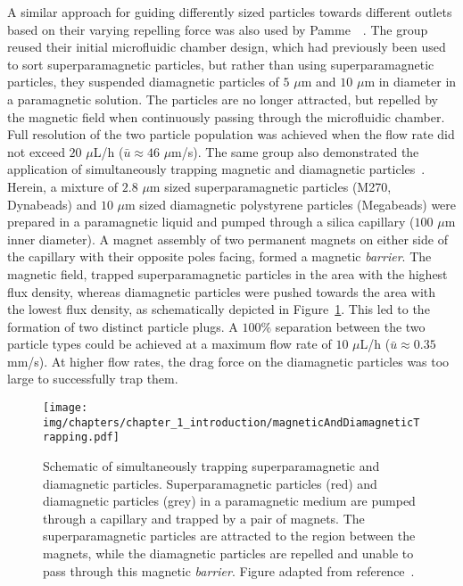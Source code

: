 A similar approach for guiding differently sized particles towards different outlets based on their varying repelling force was also used by Pamme~\etal{}~\cite{Tarn2009,Peyman2009,Vojtisek2012}. The group reused their initial microfluidic chamber design, which had previously been used to sort superparamagnetic particles, but rather than using superparamagnetic particles, they suspended diamagnetic particles of $5$ $\mu$m and $10$ $\mu$m in diameter in a paramagnetic solution. The particles are no longer attracted, but repelled by the magnetic field when continuously passing through the microfluidic chamber. Full resolution of the two particle population was achieved when the flow rate did not exceed $20$ $\mu$L/h ($\bar{u} \approx 46$ $\mu$m/s). The same group also demonstrated the application of simultaneously trapping magnetic and diamagnetic particles~\cite{Peyman2009,Tarn2013}. Herein, a mixture of $2.8$ $\mu$m sized superparamagnetic particles (M270, Dynabeads) and $10$ $\mu$m sized diamagnetic polystyrene particles (Megabeads) were prepared in a paramagnetic liquid and pumped through a silica capillary ($100$ $\mu$m inner diameter). A magnet assembly of two permanent magnets on either side of the capillary with their opposite poles facing, formed a magnetic \textit{barrier}. The magnetic field, trapped superparamagnetic particles in the area with the highest flux density, whereas diamagnetic particles were pushed towards the area with the lowest flux density, as schematically depicted in Figure~\ref{fig:diamagneticParticleTrapping}. This led to the formation of two distinct particle plugs. A $100\%$ separation between the two particle types could be achieved at a maximum flow rate of $10$ $\mu$L/h ($\bar{u} \approx 0.35$ mm/s). At higher flow rates, the drag force on the diamagnetic particles was too large to successfully trap them.

\begin{figure}[htb]
        \centering
		\texttt{[image: img/chapters/chapter\_1\_introduction/magneticAndDiamagneticTrapping.pdf]}
        \caption[Diamagnetic plug trapping technique]{Schematic of simultaneously trapping superparamagnetic and diamagnetic particles. Superparamagnetic particles (red) and diamagnetic particles (grey) in a paramagnetic medium are pumped through a capillary and trapped by a pair of magnets. The superparamagnetic particles are attracted to the region between the magnets, while the diamagnetic particles are repelled and unable to pass through this magnetic \textit{barrier}. Figure adapted from reference~\cite{Tarn2013}.}
        \label{fig:diamagneticParticleTrapping}
\end{figure}


